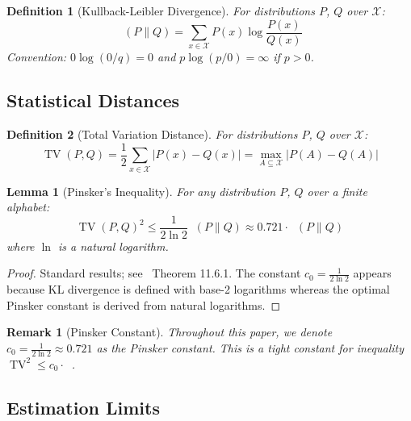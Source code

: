 \documentclass{ieeeaccess}
\DeclareMathOperator{\TV}{TV}
\DeclareMathOperator{\KL}{D_{\text{KL}}}
\newtheorem{lemma}{Lemma}[subsection]
\newtheorem{definition}{Definition}[subsection]
\newtheorem{remark}{Remark}[subsection]
\begin{document}
\begin{definition}[Kullback-Leibler Divergence]\label{def:kl_divergence}
For distributions $P$, $Q$ over $\mathcal{X}$:
\begin{equation}
\KL(P\|Q) = \sum_{x \in \mathcal{X}} P(x)\log\frac{P(x)}{Q(x)}
\end{equation}
Convention: $0\log(0/q) = 0$ and $p\log(p/0) = \infty$ if $p > 0$.
\end{definition}

\subsection{Statistical Distances}

\begin{definition}[Total Variation Distance]\label{def:tv_distance}
For distributions $P$, $Q$ over $\mathcal{X}$:
\begin{equation}
\TV(P,Q) = \frac{1}{2}\sum_{x \in \mathcal{X}} |P(x) - Q(x)| = \max_{A \subseteq \mathcal{X}} |P(A) - Q(A)|
\end{equation}
\end{definition}

\begin{lemma}[Pinsker's Inequality]\label{lem:pinsker}
For any distribution $P$, $Q$ over a finite alphabet:
\begin{equation}
\TV(P,Q)^2 \leq \frac{1}{2\ln 2} \KL(P\|Q) \approx 0.721 \cdot \KL(P\|Q)
\end{equation}
where $\ln$ is a natural logarithm.
\end{lemma}

\begin{proof}
Standard results; see~\cite{CoverThomas06} Theorem 11.6.1. The constant $c_0 = \frac{1}{2\ln 2}$ appears because KL divergence is defined with base-2 logarithms whereas the optimal Pinsker constant is derived from natural logarithms.
\end{proof}

\begin{remark}[Pinsker Constant]
Throughout this paper, we denote $c_0 = \frac{1}{2\ln 2} \approx 0.721$ as the Pinsker constant. This is a tight constant for  inequality $\TV^2 \leq c_0 \cdot \KL$.
\end{remark}

\subsection{Estimation Limits}
\end{document}
